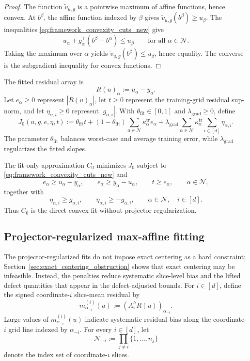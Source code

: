 \documentclass[11pt,letterpaper]{article}
\theoremstyle{definition}
\theoremstyle{remark}
\newcommand{\fit}{\mathrm{fit}}
\begin{document}
\begin{proof}
The function $\widetilde v_{u,g}$ is a pointwise maximum of affine functions,
hence convex. At $b^\beta$, the affine function indexed by $\beta$ gives
$\widetilde v_{u,g}(b^\beta)\ge u_\beta$. The inequalities
\eqref{eq:framework_convexity_cuts_new} give
$$
u_\alpha+g_\alpha^\top(b^\beta-b^\alpha)\le u_\beta
\qquad
\text{for all }\alpha\in\mathcal N.
$$
Taking the maximum over $\alpha$ yields
$\widetilde v_{u,g}(b^\beta)\le u_\beta$, hence equality. The converse is the
subgradient inequality for convex functions.
\end{proof}

The fitted residual array is
$$
R(u)_\alpha:=u_\alpha-y_\alpha.
$$
Let $e_\alpha\ge0$ represent $|R(u)_\alpha|$, let $t\ge0$ represent the
training-grid residual sup-norm, and let $\eta_{\alpha,i}\ge0$ represent
$|g_{\alpha,i}|$. With $\theta_{\fit}\in[0,1]$ and
$\lambda_{\mathrm{grad}}\ge0$, define
\begin{equation}
\label{eq:framework_common_fit_objective}
J_0(u,g,e,\eta,t)
:=
\theta_{\fit}t
+
(1-\theta_{\fit})
\sum_{\alpha\in\mathcal N}\kappa_\alpha^{\mathrm{tr}}e_\alpha
+
\lambda_{\mathrm{grad}}
\sum_{\alpha\in\mathcal N}
\kappa_\alpha^{\mathrm{tr}}
\sum_{i\in[d]}\eta_{\alpha,i}.
\end{equation}
The parameter $\theta_{\fit}$ balances worst-case and average training error,
while $\lambda_{\mathrm{grad}}$ regularizes the fitted slopes.

The fit-only approximation $C_0$ minimizes $J_0$ subject to
\eqref{eq:framework_convexity_cuts_new} and
$$
e_\alpha\ge u_\alpha-y_\alpha,
\qquad
e_\alpha\ge y_\alpha-u_\alpha,
\qquad
t\ge e_\alpha,
\qquad
\alpha\in\mathcal N,
$$
together with
$$
\eta_{\alpha,i}\ge g_{\alpha,i},
\qquad
\eta_{\alpha,i}\ge -g_{\alpha,i},
\qquad
\alpha\in\mathcal N,\quad i\in[d].
$$
Thus $C_0$ is the direct convex fit without projector regularization.

\subsection{Projector-regularized max-affine fitting } 
\label{subsec:framework_projector_regularized_fitting}

The projector-regularized fits do not impose exact centering as a hard
constraint; Section~\ref{sec:exact_centering_obstruction} shows that exact
centering may be infeasible. Instead, the penalties reduce systematic
slice-level bias and the lifted defect quantities that appear in the
defect-adjusted bounds. For $i\in[d]$, define the signed coordinate-$i$ slice-mean
residual by
$$
m_{\alpha_{-i}}^{(i)}(u)
:=
(A_i^hR(u))_{\alpha_{-i}}.
$$
Large values of $m_{\alpha_{-i}}^{(i)}(u)$ indicate systematic residual bias
along the coordinate-$i$ grid line indexed by $\alpha_{-i}$. For every $i\in[d]$, let
$$
\mathcal N_{-i}
:=
\prod_{j\neq i}\{1,\ldots,n_j\}
$$
denote the index set of coordinate-$i$ slices.
\end{document}

